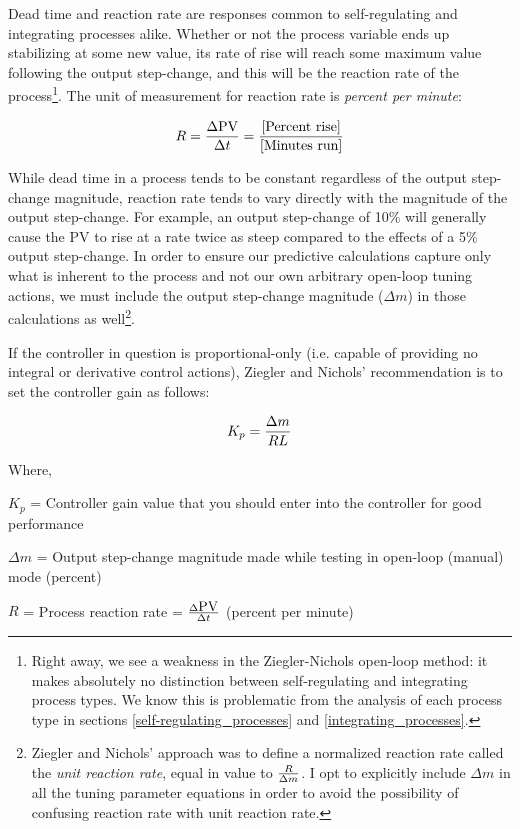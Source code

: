 Dead time and reaction rate are responses common to self-regulating and integrating processes alike.  Whether or not the process variable ends up stabilizing at some new value, its rate of rise will reach some maximum value following the output step-change, and this will be the reaction rate of the process\footnote{Right away, we see a weakness in the Ziegler-Nichols open-loop method: it makes absolutely no distinction between self-regulating and integrating process types.  We know this is problematic from the analysis of each process type in sections \ref{self-regulating_processes} and \ref{integrating_processes}.}.  The unit of measurement for reaction rate is \textit{percent per minute}:

$$R = {\Delta \hbox{PV} \over \Delta t} = {[\hbox{Percent rise}] \over [\hbox{Minutes run}]}$$

While dead time in a process tends to be constant regardless of the output step-change magnitude, reaction rate tends to vary directly with the magnitude of the output step-change.  For example, an output step-change of 10\% will generally cause the PV to rise at a rate twice as steep compared to the effects of a 5\% output step-change.  In order to ensure our predictive calculations capture only what is inherent to the process and not our own arbitrary open-loop tuning actions, we must include the output step-change magnitude ($\Delta m$) in those calculations as well\footnote{Ziegler and Nichols' approach was to define a normalized reaction rate called the \textit{unit reaction rate}, equal in value to $R \over \Delta m$.  I opt to explicitly include $\Delta m$ in all the tuning parameter equations in order to avoid the possibility of confusing reaction rate with unit reaction rate.}.  

\vskip 10pt

If the controller in question is proportional-only (i.e. capable of providing no integral or derivative control actions), Ziegler and Nichols' recommendation is to set the controller gain as follows:

$$K_p = {\Delta m \over {R L}}$$

\noindent
Where,

$K_p$ = Controller gain value that you should enter into the controller for good performance

$\Delta m$ = Output step-change magnitude made while testing in open-loop (manual) mode (percent)

$R$ = Process reaction rate = ${\Delta \hbox{PV} \over \Delta t}$ (percent per minute)

